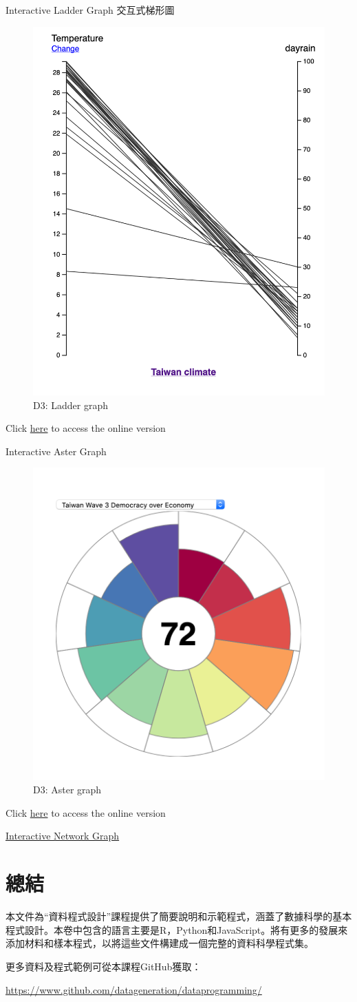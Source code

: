 \documentclass[]{book}
\begin{document}
Interactive Ladder Graph 交互式梯形圖

\begin{figure}
\includegraphics[width=0.5\linewidth]{laddergraph_twclimate} \caption{D3: Ladder graph}\label{fig:D3laddergraph}
\end{figure}

Click \href{https://karl-ho.github.io/D3/lg_twclimate/index.html}{here} to access the online version

Interactive Aster Graph

\begin{figure}
\includegraphics[width=0.5\linewidth]{astergraph_twhkdemocracy} \caption{D3: Aster graph}\label{fig:D3astergraph}
\end{figure}

Click \href{https://www.utdallas.edu/~kyho/present/aster/lpm.html}{here} to access the online version

\href{https://karl-ho.github.io/D3/createnetwork/index.html}{Interactive Network Graph}

\hypertarget{section-12}{%
\chapter{總結}\label{section-12}}

本文件為``資料程式設計''課程提供了簡要說明和示範程式，涵蓋了數據科學的基本程式設計。本卷中包含的語言主要是R，Python和JavaScript。將有更多的發展來添加材料和樣本程式，以將這些文件構建成一個完整的資料科學程式集。

更多資料及程式範例可從本課程GitHub獲取：

\url{https://www.github.com/datageneration/dataprogramming/}


\end{document}
